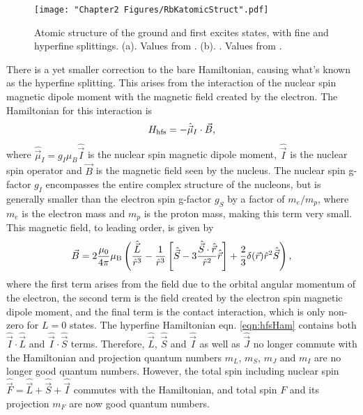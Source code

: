 \begin{figure}
	\texttt{[image: "Chapter2 Figures/RbKatomicStruct".pdf]}
\caption[Atomic structure of the ground and first excites states]{Atomic structure of the ground and first excites states, with fine and hyperfine splittings. (a)\Rb{}. Values from \cite{Steck}. (b). \K{}. Values from \cite{Tiecke}.}
\label{fig:RbKatomicStruct}
\end{figure}

There is a yet smaller correction to the bare Hamiltonian, causing what's known as the hyperfine splitting. This arises from the interaction of the nuclear spin magnetic dipole moment with the magnetic field created by the electron. The Hamiltonian for this interaction is
\begin{equation}
H_{\rm hfs} = -\hat{\vec{\mu}}_{I}\cdot\vec{B},
\label{eqn:hfsHam}
\end{equation}
where $\hat{\vec{\mu}}_{I} = g_I\mu_B\hat{\vec{I}}$ is the nuclear spin magnetic dipole moment, $\hat{\vec{I}}$ is the nuclear spin operator and $\vec{B}$ is the magnetic field seen by the nucleus. The nuclear spin g-factor $g_I$ encompasses the entire complex structure of the nucleons, but is generally smaller than the electron spin g-factor $g_S$ by a factor of $m_e/m_p$, where $m_e$ is the electron mass and $m_p$ is the proton mass, making this term very small.  This magnetic field, to leading order, is given by \cite{Arimondo1977, Steck}
\begin{equation}
\vec{B} = 2\frac{\mu_0}{4\pi}\mu_{\rm B}\left(\frac{\hat{\vec{L}}}{\hat{r}^3} -\frac{1}{\hat{r}^3}\left[\hat{\vec{S}}-3\frac{\hat{\vec{S}}\cdot \hat{\vec{r}}}{\hat{r}^2}\hat{\vec{r}}\right]+\frac{2}{3}\delta(\vec{r}){\hat{r}^2}\hat{\vec{S}}\right),
\end{equation}
where the first term arises from the field due to the orbital angular momentum of the electron, the second term is the field created by the electron spin magnetic dipole moment, and the final term is the contact interaction, which is only non-zero for $L=0$ states. The hyperfine Hamiltonian eqn. \ref{eqn:hfsHam} contains both $\hat{\vec{I}}\cdot\hat{\vec{L}}$ and $\hat{\vec{I}}\cdot\hat{\vec{S}}$ terms. Therefore, $\hat{\vec{L}}$, $\hat{\vec{S}}$ and $\hat{\vec{I}}$ as well as $\hat{\vec{J}}$ no longer commute with the Hamiltonian and projection quantum numbers $m_L$, $m_S$, $m_J$ and $m_I$ are no longer good quantum numbers. However, the total spin including nuclear spin $\hat{\vec{F}} = \hat{\vec{L}}+\hat{\vec{S}}+\hat{\vec{I}}$ commutes with the Hamiltonian, and total spin $F$ and its projection $m_F$ are now good quantum numbers.

